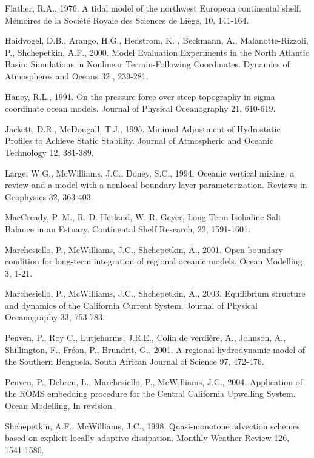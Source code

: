 Flather, R.A., 1976.
A tidal model of the northwest European continental shelf.
M\'emoires de la Soci\'et\'e Royale des Sciences de Li\`ege, 
10, 
141-164.

Haidvogel, D.B., Arango, H.G., Hedstrom, K. , Beckmann, A.,
Malanotte-Rizzoli, P., Shchepetkin, A.F.,
2000.
Model Evaluation Experiments in the North Atlantic Basin:
Simulations in Nonlinear Terrain-Following Coordinates.
Dynamics of Atmospheres and Oceans
32 ,
239-281.

Haney, R.L.,
1991.
On the pressure force over steep
topography in sigma coordinate ocean models.
Journal of Physical Oceanography
21,
610-619.

Jackett, D.R., McDougall, T.J.,
1995.
Minimal Adjustment of Hydrostatic Profiles to 
Achieve Static Stability.
Journal of Atmospheric and Oceanic Technology
12,
381-389.

Large, W.G., McWilliams, J.C., Doney, S.C.,
1994.
Oceanic vertical mixing: a review and a model
with a nonlocal boundary layer parameterization.
Reviews in Geophysics
32,
363-403.

MacCready, P. M., R. D. Hetland, W. R. Geyer, 
Long-Term Isohaline Salt Balance in an Estuary. 
Continental Shelf Research, 22, 1591-1601.

Marchesiello, P., McWilliams, J.C., Shchepetkin, A.,
2001.
Open boundary condition for long-term integration of regional oceanic
models.
Ocean Modelling
3,
1-21.

Marchesiello, P., McWilliams, J.C., Shchepetkin, A.,
2003.
Equilibrium structure and dynamics of the California Current System.
Journal of Physical Oceanography
33,
753-783.

Penven, P., Roy C., Lutjeharms, J.R.E., 
Colin de verdi\`ere, A., Johnson, A., Shillington, F.,
Fr\'eon, P., Brundrit, G.,
2001.
A regional hydrodynamic model of the Southern Benguela.
South African Journal of Science
97,
472-476.

Penven, P., Debreu, L., Marchesiello,  P., McWilliams, J.C.,
2004.
Application of the ROMS embedding procedure for the Central 
California Upwelling System.
Ocean Modelling, 
In revision.

Shchepetkin, A.F., McWilliams, J.C.,
1998.
Quasi-monotone advection schemes based on explicit locally
adaptive dissipation.
Monthly Weather Review
126,
1541-1580.

